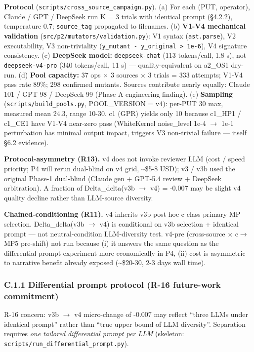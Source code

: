 \documentclass[review,12pt,authoryear]{elsarticle}
\begin{document}
\textbf{Protocol} (\texttt{scripts/cross\_source\_campaign.py}). (a) For
each (PUT, operator), Claude / GPT / DeepSeek run K = 3 trials with
identical prompt (§4.2.2), temperature 0.7; \texttt{source\_tag}
propagated to filenames. (b) \textbf{V1-V4 mechanical validation}
(\texttt{src/p2/mutators/validation.py}): V1 syntax
(\texttt{ast.parse}), V2 executability, V3 non-triviality
(\texttt{\textbar{}y\_mutant\ -\ y\_original\textbar{}\ \textgreater{}\ 1e-6}),
V4 signature consistency. (c) \textbf{DeepSeek model:}
\texttt{deepseek-chat} (113 tokens/call, 1.8 s), not
\texttt{deepseek-v4-pro} (340 tokens/call, 11 s) --- quality-equivalent
on a2\_OS1 dry-run. (d) \textbf{Pool capacity:} 37 ops $\times$ 3 sources $\times$ 3
trials = 333 attempts; V1-V4 pass rate 89\%; 298 confirmed mutants.
Sources contribute nearly equally: Claude 101 / GPT 98 / DeepSeek 99
(Phase A engineering finding). (e) \textbf{Sampling}
(\texttt{scripts/build\_pools.py}, POOL\_VERSION = v4): per-PUT 30 max,
measured mean 24.3, range 10-30. c1 (GPR) yields only 10 because c1\_HP1
/ c1\_CE1 have V1-V4 near-zero pass (WhiteKernel noise\_level 1e-4 $\to$
1e-1 perturbation has minimal output impact, triggers V3 non-trivial
failure --- itself §6.2 evidence).

\textbf{Protocol-asymmetry (R13).} v4 does not invoke reviewer LLM (cost
/ speed priority; P4 will rerun dual-blind on v4 grid,
\textasciitilde\$5-8 USD); v3 / v3b used the original Phase-1 dual-blind
(Claude gen + GPT-5.4 review + DeepSeek arbitration). A fraction of
Delta\_delta(v3b $\to$ v4) = -0.007 may be slight v4 quality decline rather
than LLM-source diversity.

\textbf{Chained-conditioning (R11).} v4 inherits v3b post-hoc c-class
primary MP selection. Delta\_delta(v3b $\to$ v4) is conditional on v3b
selection + identical prompt --- not neutral-condition LLM-diversity
test. v4-pre (cross-source $\times$ c$\to$MP5 pre-shift) not run because (i) it
answers the same question as the differential-prompt experiment more
economically in P4, (ii) cost is asymmetric to narrative benefit already
exposed (\textasciitilde\$20-30, 2-3 days wall time).

\subsubsection{C.1.1 Differential prompt protocol (R-16 future-work
commitment)}\label{c.1.1-differential-prompt-protocol-r-16-future-work-commitment}

R-16 concern: v3b $\to$ v4 micro-change of -0.007 may reflect ``three LLMs
under identical prompt'' rather than ``true upper bound of LLM
diversity''. Separation requires \emph{one tailored differential prompt
per LLM} (skeleton: \texttt{scripts/run\_differential\_prompt.py}).
\end{document}
